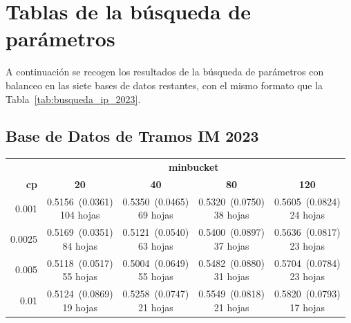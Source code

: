 \documentclass[twoside,a4paper,12pt,onecolumn,openany]{book}
\begin{document}
\section*{Tablas de la búsqueda de parámetros}
A continuación se recogen los resultados de la búsqueda de parámetros con balanceo en las siete bases de datos restantes, con el mismo formato que la Tabla~\ref{tab:busqueda_ip_2023}.
 
\subsection*{Base de Datos de Tramos IM 2023}
 
\begin{table}[H]
\centering
\small
\setlength{\tabcolsep}{4pt}
\begin{tabular}{r|cccc}
\toprule
 & \multicolumn{4}{c}{\textbf{minbucket}} \\
\cmidrule(lr){2-5}
\textbf{cp} & \textbf{20} & \textbf{40} & \textbf{80} & \textbf{120} \\
\midrule
0.001 & \shortstack{0.5156~(0.0361)\\ 104 hojas} & \shortstack{0.5350~(0.0465)\\ 69 hojas} & \shortstack{0.5320~(0.0750)\\ 38 hojas} & \shortstack{0.5605~(0.0824)\\ 24 hojas} \\[4pt]
0.0025 & \shortstack{0.5169~(0.0351)\\ 84 hojas} & \shortstack{0.5121~(0.0540)\\ 63 hojas} & \shortstack{0.5400~(0.0897)\\ 37 hojas} & \shortstack{0.5636~(0.0817)\\ 23 hojas} \\[4pt]
0.005 & \shortstack{0.5118~(0.0517)\\ 55 hojas} & \shortstack{0.5004~(0.0649)\\ 55 hojas} & \shortstack{0.5482~(0.0880)\\ 31 hojas} & \shortstack{0.5704~(0.0784)\\ 23 hojas} \\[4pt]
0.01 & \shortstack{0.5124~(0.0869)\\ 19 hojas} & \shortstack{0.5258~(0.0747)\\ 21 hojas} & \shortstack{0.5549~(0.0818)\\ 21 hojas} & \shortstack{0.5820~(0.0793)\\ 17 hojas} \\[4pt]

\end{tabular}
\end{table}
\end{document}
